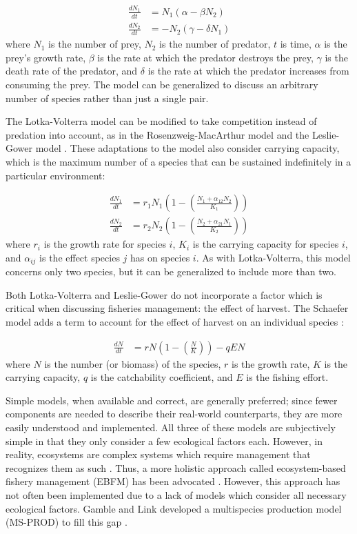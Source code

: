 \begin{align}
   \frac{d N_1}{dt} &=   N_1 \left(\alpha - \beta  N_2\right) 
\\ \frac{d N_2}{dt} &= - N_2 \left(\gamma - \delta N_1\right)
\end{align}
where $N_1$ is the number of prey, $N_2$ is the number of predator, $t$ is time, $\alpha$ is the prey's growth rate, $\beta$ is the rate at which the predator destroys the prey, $\gamma$ is the death rate of the predator, and $\delta$ is the rate at which the predator increases from consuming the prey.  The model can be generalized to discuss an arbitrary number of species rather than just a single pair.

The Lotka-Volterra model can be modified to take competition instead of predation into account, as in the Rosenzweig-MacArthur model \cite{rosenzweig1963} and the Leslie-Gower model \cite{leslie1960}.  These adaptations to the model also consider carrying capacity, which is the maximum number of a species that can be sustained indefinitely in a particular environment:

\begin{align}
   \frac{d N_1}{dt} &= r_1 N_1 \left(1 - \left(\frac{N_1 + \alpha_{12} N_2}{K_1}\right)\right)
\\ \frac{d N_2}{dt} &= r_2 N_2 \left(1 - \left(\frac{N_2 + \alpha_{21} N_1}{K_2}\right)\right)
\end{align}
where $r_i$ is the growth rate for species $i$, $K_i$ is the carrying capacity for species $i$, and $\alpha_{ij}$ is the effect species $j$ has on species $i$.  As with Lotka-Volterra, this model concerns only two species, but it can be generalized to include more than two.

Both Lotka-Volterra and Leslie-Gower do not incorporate a factor which is critical when discussing fisheries management: the effect of harvest.  The Schaefer model adds a term to account for the effect of harvest on an individual species \cite{schaefer1957}:

\begin{align}
   \frac{d N}{dt} &= r N \left(1 - \left(\frac{N}{K}\right)\right) - q E N
\end{align}
where $N$ is the number (or biomass) of the species, $r$ is the growth rate, $K$ is the carrying capacity, $q$ is the catchability coefficient, and $E$ is the fishing effort.

Simple models, when available and correct, are generally preferred; since fewer components are needed to describe their real-world counterparts, they are more easily understood and implemented.  All three of these models are subjectively simple in that they only consider a few ecological factors each. However, in reality, ecosystems are complex systems which require management that recognizes them as such \cite{christensen1996}.  Thus, a more holistic approach called ecosystem-based fishery management (EBFM) has been advocated \cite{united1999}.  However, this approach has not often been implemented due to a lack of models which consider all necessary ecological factors.  Gamble and Link developed a multispecies production model (MS-PROD) to fill this gap \cite{gamble2009}.

